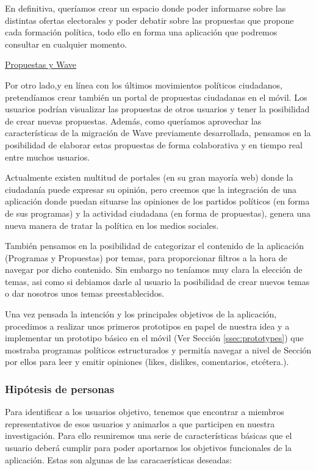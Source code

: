 En definitiva, queríamos crear un espacio donde poder informarse sobre las distintas ofertas electorales y poder debatir sobre las propuestas que propone cada formación política, todo ello en forma una aplicación que podremos consultar en cualquier momento. 

\underline{Propuestas y Wave}

Por otro lado,y en línea con los últimos movimientos políticos ciudadanos, pretendíamos crear también un portal de propuestas ciudadanas en el móvil. Los usuarios podrían visualizar las propuestas de otros usuarios y tener la posibilidad de crear nuevas propuestas. Además, como queríamos aprovechar las características de la migración de Wave previamente desarrollada, pensamos en la posibilidad de elaborar estas propuestas de forma colaborativa y en tiempo real entre muchos usuarios.

Actualmente existen multitud de portales (en su gran mayoría web) donde la ciudadanía puede expresar su opinión, pero creemos que la integración de una aplicación donde puedan situarse las opiniones de los partidos políticos (en forma de sus programas) y la actividad ciudadana (en forma de propuestas), genera una nueva manera de tratar la política en los medios sociales.

También pensamos en la posibilidad de categorizar el contenido de la aplicación (Programas y Propuestas) por temas, para proporcionar filtros a la hora de navegar por dicho contenido. Sin embargo no teníamos muy clara la elección de temas, asi como si debiamos darle al usuario la posibilidad de crear nuevos temas o dar nosotros unos temas preestablecidos.
 
Una vez pensada la intención y los principales objetivos de la aplicación, procedimos a realizar unos primeros prototipos en papel de nuestra idea y a implementar un prototipo básico en el móvil (Ver Sección \ref{ssec:prototypes}) que mostraba programas políticos estructurados y permitía navegar a nivel de Sección por ellos para leer y emitir opiniones (likes, dislikes, comentarios, etcétera.).  

\subsubsection{Hipótesis de personas}

Para identificar a los usuarios objetivo, tenemos que encontrar a miembros representativos de esos usuarios y animarlos a que participen en nuestra investigación. Para ello reuniremos una serie de características básicas que el usuario deberá cumplir para poder aportarnos los objetivos funcionales de la aplicación. Estas son algunas de las caracaerísticas deseadas:

